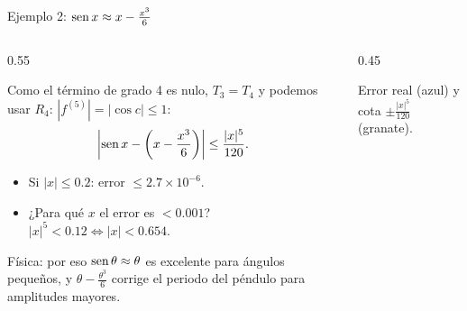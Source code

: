 \documentclass[10pt,aspectratio=169]{beamer}
\begin{document}
\begin{frame}{Ejemplo 2: $\operatorname{sen} x\approx x-\frac{x^3}6$}
  \begin{columns}
    \begin{column}{0.55\textwidth}
      \begin{ejemplo}
        Como el término de grado 4 es nulo, $T_3=T_4$ y podemos usar $R_4$: $|f^{(5)}|=|\cos c|\le1$:
        \[ \left|\operatorname{sen} x-\left(x-\frac{x^3}6\right)\right|\le\frac{|x|^5}{120}. \]
        \begin{itemize}
          \item Si $|x|\le0.2$: error $\le2.7\times10^{-6}$.
          \item ¿Para qué $x$ el error es $<0.001$? \ $|x|^5<0.12\iff|x|<0.654$.
        \end{itemize}
      \end{ejemplo}
      \small Física: por eso $\operatorname{sen}\theta\approx\theta$ es excelente para ángulos pequeños, y $\theta-\frac{\theta^3}{6}$ corrige el periodo del péndulo para amplitudes mayores.
    \end{column}
    \begin{column}{0.45\textwidth}
      \centering

      \small Error real (azul) y cota $\pm\frac{|x|^5}{120}$ (granate).
    \end{column}
  \end{columns}
\end{frame}
\end{document}
